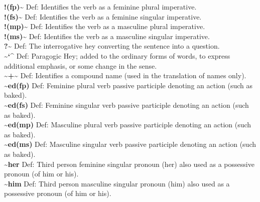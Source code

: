 {\vspace{-1ex}
\textbf{!(fp)\textasciitilde{}} Def: Identifies the verb as a feminine plural imperative.\hfill{}\\

\textbf{!(fs)\textasciitilde{}} Def: Identifies the verb as a feminine singular imperative.\hfill{}\\

\textbf{!(mp)\textasciitilde{}} Def: Identifies the verb as a masculine plural imperative.\hfill{}\\

\textbf{!(ms)\textasciitilde{}} Def: Identifies the verb as a masculine singular imperative.\hfill{}\\

\textbf{?\textasciitilde{}} Def: The interrogative hey converting the sentence into a question.\hfill{}\\

\textbf{\textasciitilde{}{\char`\^}} Def: Paragogic Hey; added to the ordinary forms of words, to express additional emphasis, or some change in the sense.\hfill{}\\

\textbf{\textasciitilde{}+\textasciitilde{}} Def: Identifies a compound name (used in the translation of names only).\hfill{}\\

\textbf{\textasciitilde{}ed(fp)} Def: Feminine plural verb passive participle denoting an action (such as baked).\hfill{}\\

\textbf{\textasciitilde{}ed(fs)} Def: Feminine singular verb passive participle denoting an action (such as baked).\hfill{}\\

\textbf{\textasciitilde{}ed(mp)} Def: Masculine plural verb passive participle denoting an action (such as baked).\hfill{}\\

\textbf{\textasciitilde{}ed(ms)} Def: Masculine singular verb passive participle denoting an action (such as baked).\hfill{}\\

\textbf{\textasciitilde{}her} Def: Third person feminine singular pronoun (her) also used as a possessive pronoun (of him or his).\hfill{}\\

\textbf{\textasciitilde{}him} Def: Third person masculine singular pronoun (him) also used as a possessive pronoun (of him or his).\hfill{}\\

}
